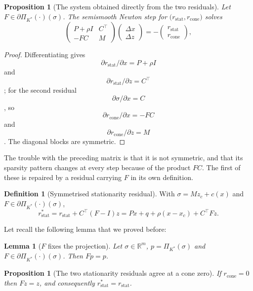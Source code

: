 \documentclass[a4paper,11pt]{book}
\theoremstyle{plain}
\newtheorem{proposition}[theorem]{Proposition}
\newtheorem{lemma}[theorem]{Lemma}
\theoremstyle{definition}
\newtheorem{definition}[theorem]{Definition}
\theoremstyle{remark}
\numberwithin{equation}{chapter}
\numberwithin{algorithm}{chapter}
\newcommand{\R}{\mathbb{R}}
\newcommand{\proj}[2]{\Pi_{#2}\!\left(#1\right)}
\begin{document}
	\begin{proposition}[The system obtained directly from the two residuals]
		Let $F\in\partial\proj{\cdot}{K^*}(\sigma)$. The semismooth Newton step for
		$\bigl(r_{\mathrm{stat}},r_{\mathrm{cone}}\bigr)$ solves
		\begin{equation}
			\begin{pmatrix}
				P+\rho I & C^\top\\
				-FC & M
			\end{pmatrix}
			\begin{pmatrix}\Delta x\\ \Delta z\end{pmatrix}
			=-\begin{pmatrix}r_{\mathrm{stat}}\\ r_{\mathrm{cone}}\end{pmatrix} ,
		\end{equation}
	\end{proposition}
	
	\begin{proof}
		Differentiating gives $$\partial r_{\mathrm{stat}}/\partial x=P+\rho I$$ and
		$$\partial r_{\mathrm{stat}}/\partial z=C^\top$$; for the second residual
		$$\partial\sigma/\partial x=C$$, so
		$$\partial r_{\mathrm{cone}}/\partial x=-FC$$ and
		$$\partial r_{\mathrm{cone}}/\partial z=M$$. The diagonal blocks are symmetric.
		
	\end{proof}
	
	The trouble with the preceding matrix is that it is not symmetric, and that
	its sparsity pattern changes at every step because of the product $FC$. The
	first of these is repaired by a residual carrying $F$ in its own definition.
	
	
	\begin{definition}[Symmetrised stationarity residual]
		With $\sigma=Mz_c+c(x)$ and $F\in\partial\proj{\cdot}{K^*}(\sigma)$,
		\begin{equation}
			r^{*}_{\mathrm{stat}}=r_{\mathrm{stat}}+C^\top(F-I)z
			=Px+q+\rho(x-x_c)+C^\top Fz .
		\end{equation}
	\end{definition}
	Let recall the following lemma that we proved before:
	\begin{lemma}[$F$ fixes the projection]
		Let $\sigma\in\R^m$, $p=\proj{\sigma}{K^*}$ and
		$F\in\partial\proj{\cdot}{K^*}(\sigma)$. Then $Fp=p$.
	\end{lemma}
	
	\begin{proposition}[The two stationarity residuals agree at a cone zero]
		If $r_{\mathrm{cone}}=0$ then $Fz=z$, and consequently
		$r^{*}_{\mathrm{stat}}=r_{\mathrm{stat}}$.
	\end{proposition}
	
\end{document}
